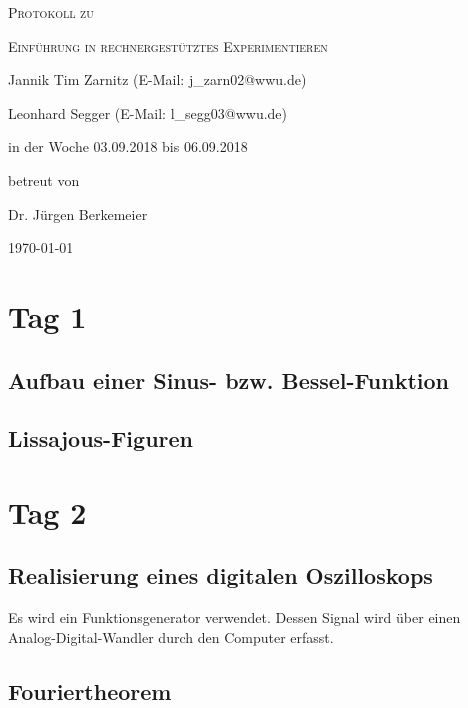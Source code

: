 \documentclass[
	a4paper,
	12pt,
	pagesize,
	ngerman
]{scrartcl}
\begin{document}
	
	\begin{titlepage}
		\centering
		{\scshape\LARGE Protokoll zu \par}
		\vspace{1cm}
		{\scshape\huge Einführung in rechnergestütztes Experimentieren \par}
		\vspace{3cm}
		
		{\large Jannik Tim Zarnitz (E-Mail: j\_zarn02@wwu.de) \par}
		{\large Leonhard Segger (E-Mail: l\_segg03@wwu.de) \par}
		\vfill
		
		in der Woche 03.09.2018 bis 06.09.2018\par
		betreut von\par
		{\large Dr. Jürgen Berkemeier}
		
		\vfill
		
		{\large \today\par}
	\end{titlepage}
	\tableofcontents
	\newpage

	\section{Tag 1} \label{Tag 1}
	
	\subsection{Aufbau einer Sinus- bzw. Bessel-Funktion}
	
	
	
	\subsection{Lissajous-Figuren}
	
	
	
	\section{Tag 2} \label{Tag 2}
	
	\subsection{Realisierung eines digitalen Oszilloskops}
	Es wird ein Funktionsgenerator verwendet.
	Dessen Signal wird über einen Analog-Digital-Wandler durch den Computer erfasst.
	
	
	\subsection{Fouriertheorem}
	
\end{document}
